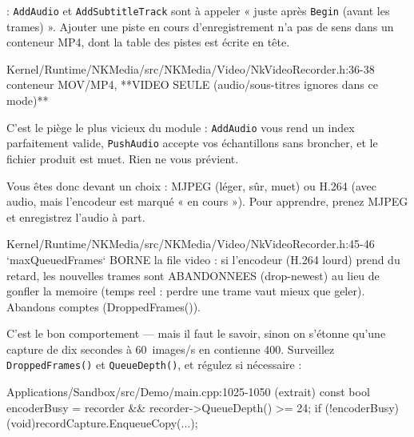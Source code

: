 \begin{nkpiege}
 : \texttt{AddAudio} et
\texttt{AddSubtitleTrack} sont à appeler « juste après \texttt{Begin} (avant les
trames) ». Ajouter une piste en cours d'enregistrement n'a pas de sens dans un
conteneur MP4, dont la table des pistes est écrite en tête.
\end{nkpiege}

\begin{nkpiege}
\begin{nkcode}{Kernel/Runtime/NKMedia/src/NKMedia/Video/NkVideoRecorder.h:36-38}
 conteneur MOV/MP4, **VIDEO SEULE (audio/sous-titres ignores dans ce mode)**
\end{nkcode}

C'est le piège le plus vicieux du module : \texttt{AddAudio} vous rend un index
parfaitement valide, \texttt{PushAudio} accepte vos échantillons sans broncher,
et le fichier produit est muet. Rien ne vous prévient.

Vous êtes donc devant un choix : MJPEG (léger, sûr, muet) ou H.264 (avec audio,
mais l'encodeur est marqué « en cours »). Pour apprendre, prenez MJPEG et
enregistrez l'audio à part.
\end{nkpiege}

\begin{nkpiege}
\begin{nkcode}{Kernel/Runtime/NKMedia/src/NKMedia/Video/NkVideoRecorder.h:45-46}
 `maxQueuedFrames` BORNE la file video : si l'encodeur (H.264 lourd) prend du retard,
 les nouvelles trames sont ABANDONNEES (drop-newest) au lieu de gonfler la memoire
 (temps reel : perdre une trame vaut mieux que geler). Abandons comptes (DroppedFrames()).
\end{nkcode}

C'est le bon comportement — mais il faut le savoir, sinon on s'étonne qu'une
capture de dix secondes à 60~images/s en contienne 400. Surveillez
\texttt{DroppedFrames()} et \texttt{QueueDepth()}, et régulez si nécessaire :

\begin{nkcode}{Applications/Sandbox/src/Demo/main.cpp:1025-1050 (extrait)}
                    const bool encoderBusy = recorder && recorder->QueueDepth() >= 24;
                    if (!encoderBusy)
                        (void)recordCapture.EnqueueCopy(...);
\end{nkcode}
\end{nkpiege}

